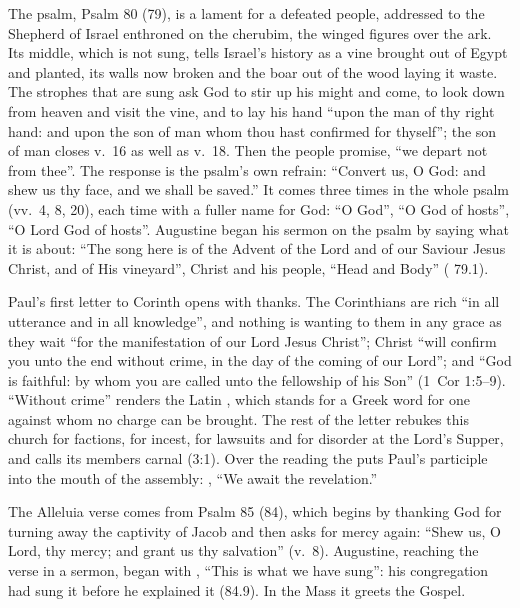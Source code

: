 The psalm, Psalm 80 (79), is a lament for a defeated people, addressed to the
Shepherd of Israel enthroned on the cherubim, the winged figures over the ark.
Its middle, which is not sung, tells Israel's history as a vine brought out of
Egypt and planted, its walls now broken and the boar out of the wood laying it
waste. The strophes that are sung ask God to stir up his might and come, to
look down from heaven and visit the vine, and to lay his hand ``upon the man
of thy right hand: and upon the son of man whom thou hast confirmed for
thyself''; the son of man closes v.~16 as well as v.~18. Then
the people promise, ``we depart not from thee''. The response
is the psalm's own refrain: ``Convert us, O God: and shew us thy face, and we
shall be saved.'' It comes three times in the whole psalm (vv.~4, 8, 20), each
time with a fuller name for God: ``O God'', ``O God of hosts'', ``O Lord God
of hosts''. Augustine began his sermon on the psalm by saying what it
is about: ``The song here is of the Advent of the Lord and of our Saviour
Jesus Christ, and of His vineyard'', Christ and his people, ``Head and Body''
( 79.1).

Paul's first letter to Corinth opens with thanks. The Corinthians are rich ``in
all utterance and in all knowledge'', and nothing is wanting to them in any
grace as they wait ``for the manifestation of our Lord Jesus Christ''; Christ
``will confirm you unto the end without crime, in the day of the coming of our
Lord''; and ``God is faithful: by whom you are called unto the fellowship of
his Son'' (1~Cor 1:5--9). ``Without crime'' renders the Latin , which stands for a Greek word for one against whom no charge can be
brought. The rest of the letter rebukes this church for
factions, for incest, for lawsuits and for disorder at the Lord's Supper, and
calls its members carnal (3:1). Over the reading the  puts Paul's
participle into the mouth of the assembly: ,
``We await the revelation.''

The Alleluia verse comes from Psalm 85 (84), which begins by thanking God for
turning away the captivity of Jacob and then asks for mercy again: ``Shew us,
O Lord, thy mercy; and grant us thy salvation'' (v.~8). Augustine, reaching
the verse in a sermon, began with , ``This is
what we have sung'': his congregation had sung it before he explained it
(84.9). In the Mass it greets the Gospel.

